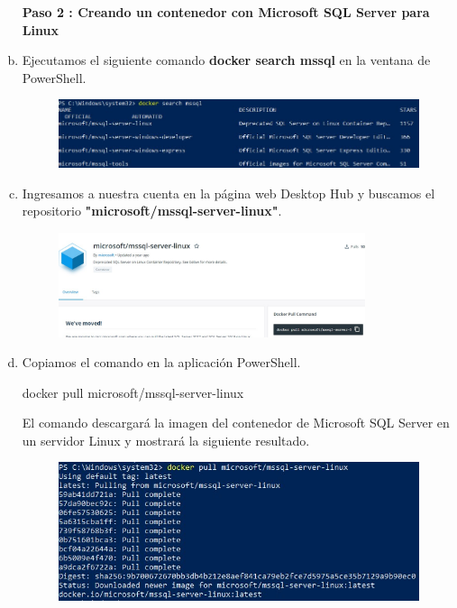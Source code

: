 \documentclass[preprint,12pt]{elsarticle}
\begin{document}
\begin{enumerate}[a)]
\textbf{Paso 2 : Creando un contenedor con Microsoft SQL Server para Linux}
\item Ejecutamos el siguiente comando \textbf{docker search mssql} en la ventana de PowerShell.
\begin{figure}[htb]
	\begin{center}
		\includegraphics[width=11cm]{./IMAGENES/Docker03}
	\end{center}
\end{figure}
\item Ingresamos a nuestra cuenta en la página web Desktop Hub y buscamos el repositorio \textbf{"microsoft/mssql-server-linux"}. 
\begin{figure}[htb]
	\begin{center}
		\includegraphics[width=9cm]{./IMAGENES/Docker04}
	\end{center}
\end{figure}
\item Copiamos el comando en la aplicación PowerShell. \begin{center}docker pull microsoft/mssql-server-linux\end{center}
El comando descargará la imagen del contenedor de Microsoft SQL Server en un servidor Linux y mostrará la siguiente resultado.
\begin{figure}[htb]
	\begin{center}
		\includegraphics[width=11cm]{./IMAGENES/Docker05}
	\end{center}
\end{figure}



\end{enumerate}
\end{document}

